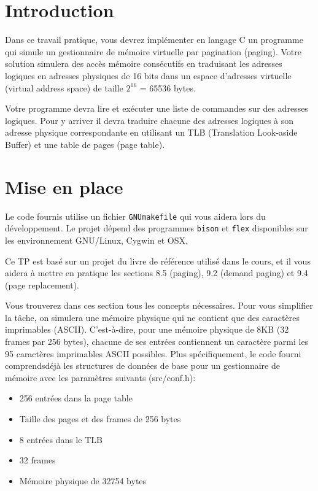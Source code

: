 \documentclass{article}
\begin{document}
\newpage
\section{Introduction}

Dans ce travail pratique, vous devrez implémenter en langage C un programme
qui simule un gestionnaire de mémoire virtuelle par pagination (paging).
Votre solution simulera des accès mémoire consécutifs en traduisant les
adresses logiques en adresses physiques de 16 bits dans un espace d'adresses
virtuelle (virtual address space) de taille $2^{16}$ = 65536 bytes.

Votre programme devra lire et exécuter une liste de commandes sur des adresses
logiques.  Pour y arriver il devra traduire chacune des adresses logiques à son
adresse physique correspondante en utilisant un TLB (Translation Look-aside
Buffer) et une table de pages (page table).

\section{Mise en place}

Le code fournis utilise un fichier \texttt{GNUmakefile} qui vous aidera lors
du développement.  Le projet dépend des programmes \texttt{bison} et
\texttt{flex} disponibles sur les environnement GNU/Linux, Cygwin et OSX.

Ce TP est basé sur un projet du livre de référence utilisé dans le cours, et
il vous aidera à mettre en pratique les sections 8.5 (paging), 9.2 (demand
paging) et 9.4 (page replacement).

Vous trouverez dans ces section tous les concepts nécessaires.  Pour vous
simplifier la tâche, on simulera une mémoire physique qui ne contient que
des caractères imprimables (ASCII).  C'est-à-dire, pour une mémoire physique
de 8KB (32 frames par 256 bytes), chacune de ses entrées contiennent un
caractère parmi les 95 caractères imprimables ASCII possibles.
Plus spécifiquement, le code fourni comprendsdéjà les structures de données
de base pour un gestionnaire de mémoire avec les paramètres suivants
(src/conf.h):

\begin{itemize}
\item 256 entrées dans la page table
\item Taille des pages et des frames de 256 bytes
\item 8 entrées dans le TLB
\item 32 frames
\item Mémoire physique de 32754 bytes
\end{itemize}
\end{document}
